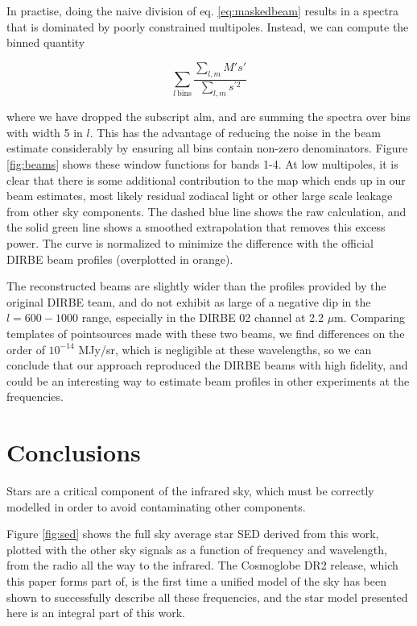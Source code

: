 \documentclass{aa}
\begin{document}
In practise, doing the naive division of eq. \ref{eq:maskedbeam} results in a spectra that is dominated by poorly constrained multipoles. Instead, we can compute the binned quantity

\begin{equation}
\sum \limits_{l\ \mathrm{ bins}}\frac{\sum \limits_{l,m} M' s'}{\sum \limits_{l,m} s^{'2}}
\end{equation}

where we have dropped the subscript alm, and are summing the spectra over bins with width 5 in $l$. This has the advantage of reducing the noise in the beam estimate considerably by ensuring all bins contain non-zero denominators. Figure \ref{fig:beams} shows these window functions for bands 1-4. At low multipoles, it is clear that there is some additional contribution to the map which ends up in our beam estimates, most likely residual zodiacal light or other large scale leakage from other sky components. The dashed blue line shows the raw calculation, and the solid green line shows a smoothed extrapolation that removes this excess power. The curve is normalized to minimize the difference with the official DIRBE beam profiles (overplotted in orange).

The reconstructed beams are slightly wider than the profiles provided by the original DIRBE team, and do not exhibit as large of a negative dip in the $l=600-1000$ range, especially in the DIRBE 02 channel at 2.2 $\mu$m. Comparing templates of pointsources made with these two beams, we find differences on the order of $10^{-14}$ MJy/sr, which is negligible at these wavelengths, so we can conclude that our approach reproduced the DIRBE beams with high fidelity, and could be an interesting way to estimate beam profiles in other experiments at the frequencies.

\section{Conclusions}
\label{sec:conclusions}

Stars are a critical component of the infrared sky, which must be correctly modelled in order to avoid contaminating other components. 

Figure \ref{fig:sed} shows the full sky average star SED derived from this work, plotted with the other sky signals as a function of frequency and wavelength, from the radio all the way to the infrared. The Cosmoglobe DR2 release, which this paper forms part of, is the first time a unified model of the sky has been shown to successfully describe all these frequencies, and the star model presented here is an integral part of this work.
\end{document}
